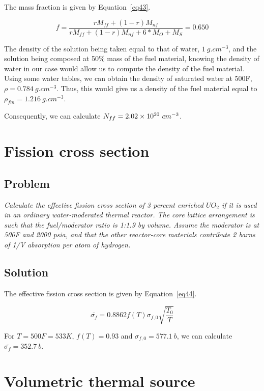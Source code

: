 The mass fraction is given by Equation~\ref{eq43}.


\begin{equation}\label{eq43}
f = \frac{rM_{ff} + (1-r)M_{nf}}{rM_{ff} + (1-r)M_{nf} + 6*M_{O} + M_S} = 0.650
\end{equation}

The density of the solution being taken equal to that of water, $1\ g.cm^{-3}$, and the solution being composed at 50\% mass of the fuel material, knowing the density of water in our case would allow us to compute the density of the fuel material. Using some water tables, we can obtain the density of saturated water at 500F, $\rho = 0.784\ g.cm^{-3}$. Thus, this would give us a density of the fuel material equal to $\rho_{fm} = 1.216\ g.cm^{-3}$.

Consequently, we can calculate $N_{ff} = \text{\num{2.02e20}}\ cm^{-3}$.

\section{Fission cross section}
\label{prob42}

\subsection{Problem}
\textit{Calculate the effective fission cross section of 3 percent enriched $UO_2$ if it is used in an ordinary water-moderated thermal reactor. The core lattice arrangement is such that the fuel/moderator ratio is 1:1.9 by volume. Assume the moderator is at 500F and 2000 psia, and that the other reactor-core materials contribute 2 barns of 1/V absorption per atom of hydrogen.}

\subsection{Solution}

The effective fission cross section is given by Equation~\ref{eq44}.


\begin{equation}\label{eq44}
\bar{\sigma_{f}} = 0.8862 f(T) \sigma_{f,0} \sqrt{\frac{T_0}{T}}
\end{equation}

For $T = 500 F = 533 K$, $f(T) = 0.93$ and $\sigma_{f, 0} = 577.1\ b$, we can calculate $\bar{\sigma_f} = 352.7\ b$.


\section{Volumetric thermal source}
\label{prob43}

